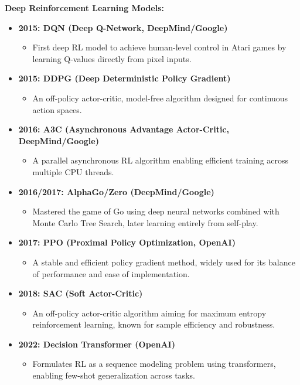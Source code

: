 \documentclass{article}
\begin{document}
\textbf{Deep Reinforcement Learning Models:}
\begin{itemize}[leftmargin=1.5em]
\item \textbf{2015: DQN (Deep Q-Network, DeepMind/Google)}
  \begin{itemize}
    \item First deep RL model to achieve human-level control in Atari games by learning Q-values directly from pixel inputs.
  \end{itemize}
\item \textbf{2015: DDPG (Deep Deterministic Policy Gradient)}
  \begin{itemize}
    \item An off-policy actor-critic, model-free algorithm designed for continuous action spaces.
  \end{itemize}
\item \textbf{2016: A3C (Asynchronous Advantage Actor-Critic, DeepMind/Google)}
  \begin{itemize}
    \item A parallel asynchronous RL algorithm enabling efficient training across multiple CPU threads.
  \end{itemize}
\item \textbf{2016/2017: AlphaGo/Zero (DeepMind/Google)}
  \begin{itemize}
    \item Mastered the game of Go using deep neural networks combined with Monte Carlo Tree Search, later learning entirely from self-play.
  \end{itemize}
\item \textbf{2017: PPO (Proximal Policy Optimization, OpenAI)}
  \begin{itemize}
    \item A stable and efficient policy gradient method, widely used for its balance of performance and ease of implementation.
  \end{itemize}
\item \textbf{2018: SAC (Soft Actor-Critic)}
  \begin{itemize}
    \item An off-policy actor-critic algorithm aiming for maximum entropy reinforcement learning, known for sample efficiency and robustness.
  \end{itemize}
\item \textbf{2022: Decision Transformer (OpenAI)}
  \begin{itemize}
    \item Formulates RL as a sequence modeling problem using transformers, enabling few-shot generalization across tasks.

\end{itemize}
\end{itemize}
\end{document}
